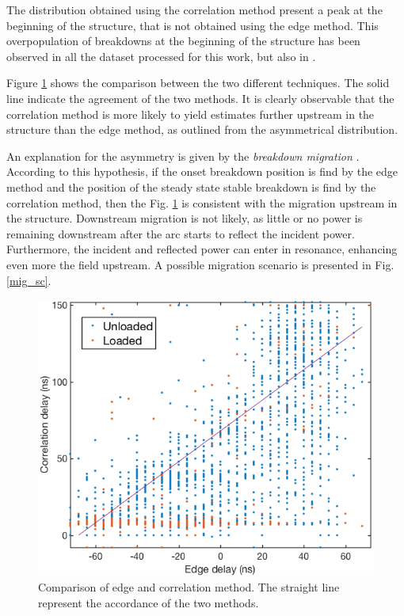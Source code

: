The distribution obtained using the correlation method present a peak at the beginning of the structure, that is not obtained using the edge method. This overpopulation of breakdowns at the beginning of the structure has been observed in all the dataset processed for this work, but also in \cite{Rajamaki:2143815}.  

Figure \ref{comp_corr_edge} shows the comparison between the two different techniques. The solid line indicate the agreement of the two methods. It is clearly observable that the correlation method is more likely to yield estimates further upstream in the structure than the edge method, as outlined from the asymmetrical distribution. 

An explanation for the asymmetry is given by the \textit{breakdown migration} \cite{Woolley:2015,Jacewicz:CLICWS16,Degiovanni:migration}. According to this hypothesis, if the onset breakdown position is find by the edge method and the position of the steady state stable breakdown is find by the correlation method, then the Fig. \ref{comp_corr_edge} is consistent with the migration upstream in the structure. Downstream migration is not likely, as little or no power is remaining downstream after the arc starts to reflect the incident power. Furthermore, the incident and reflected power can enter in resonance, enhancing even more the field upstream.
A possible migration scenario is presented in Fig. \ref{mig_sc}.

\begin{figure}[h]
\centering 
\includegraphics[scale=0.4]{pictures/methods_comparison.png}
\caption{Comparison of edge and correlation method. The straight line represent the accordance of the two methods.}
\label{comp_corr_edge}
\end{figure}

